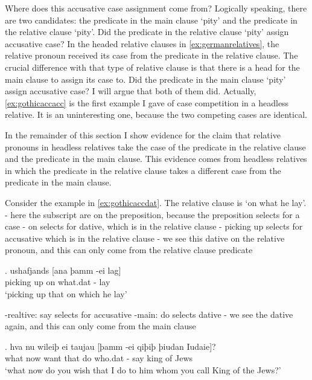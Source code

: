 Where does this accusative case assignment come from? Logically speaking, there are two candidates: the predicate in the main clause  `pity' and the predicate in the relative clause  `pity'. Did the predicate in the relative clause  `pity' assign accusative case? In the headed relative clauses in \ref{ex:germanrelatives}, the relative pronoun received its case from the predicate in the relative clause. The crucial difference with that type of relative clause is that there is a head for the main clause to assign its case to. Did the predicate in the main clause  `pity' assign accusative case? I will argue that both of them did. Actually, \ref{ex:gothicaccacc} is the first example I gave of case competition in a headless relative. It is an uninteresting one, because the two competing cases are identical.

In the remainder of this section I show evidence for the claim that relative pronouns in headless relatives take the case of the predicate in the relative clause and the predicate in the main clause. This evidence comes from headless relatives in which the predicate in the relative clause takes a different case from the predicate in the main clause.

Consider the example in \ref{ex:gothicaccdat}. The relative clause is  `on what he lay'.
- here the subscript are on the preposition, because the preposition selects for a case
- on selects for dative, which is in the relative clause
- picking up selects for accusative which is in the relative clause
- we see this dative on the relative pronoun, and this can only come from the relative clause predicate

\exg. ushafjands [ana þamm -ei lag]\\
 {picking up}\scsub{[acc]} on\scsub{[dat]} what.\ac{dat} - lay\\
 `picking up that on which he lay' \label{ex:gothicaccdat}

-realtive: say selects for accusative
-main: do selects dative
- we see the dative again, and this can only come from the main clause

\exg. hva nu wileiþ ei taujau [þamm -ei qiþiþ þiudan Iudaie]?\\
 what now want that do\scsub{[dat]} who.\ac{dat} - say\scsub{[acc]} king {of Jews}\\
 `what now do you wish that I do to him whom you call King of the Jews?' 





